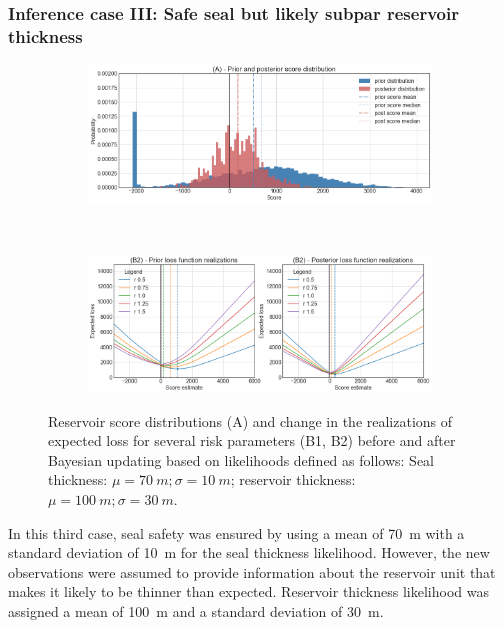 				\subsubsection{Inference case III: Safe seal but likely subpar reservoir thickness}
				\begin{figure}[h]
					\begin{subfigure}{1\textwidth}
						\centering
						\includegraphics[width=1\linewidth]{Figures/update_smallres2.png}
					\end{subfigure}%
					\\
					\begin{subfigure}{1\textwidth}
						\centering
						\includegraphics[width=1\linewidth]{Figures/update_smallres3.png}
					\end{subfigure}
					\caption{Reservoir score distributions (A) and change in the realizations of expected loss for several risk parameters (B1, B2) before and after Bayesian updating based on likelihoods defined as follows: Seal thickness: $\mu = 70~m; \sigma = 10~m$; reservoir thickness: $\mu = 100~m; \sigma = 30~m$.}
					\label{fig:update_smallres2_3}
				\end{figure}
				In this third case, seal safety was ensured by using a mean of 70~m with a standard deviation of 10~m for the seal thickness likelihood. However, the new observations were assumed to provide information about the reservoir unit that makes it likely to be thinner than expected. Reservoir thickness likelihood was assigned a mean of 100~m and a standard deviation of 30~m.\\
